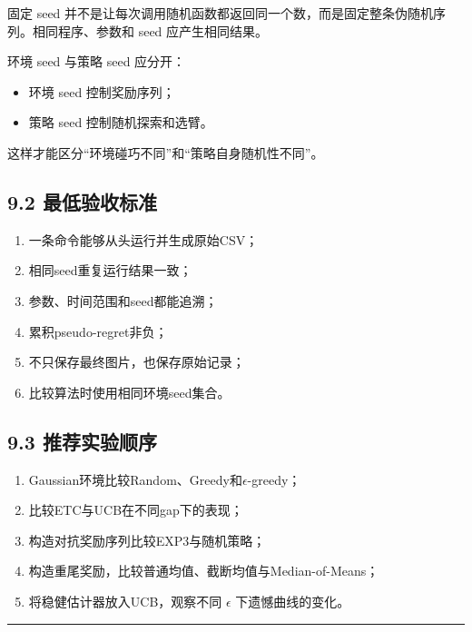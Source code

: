 \documentclass[
  11pt,
  a4paper,
]{ctexart}
\providecommand{\tightlist}{%
  \setlength{\itemsep}{0pt}\setlength{\parskip}{0pt}}
\begin{document}
固定 seed
并不是让每次调用随机函数都返回同一个数，而是固定整条伪随机序列。相同程序、参数和
seed 应产生相同结果。

环境 seed 与策略 seed 应分开：

\begin{itemize}
\tightlist
\item
  环境 seed 控制奖励序列；
\item
  策略 seed 控制随机探索和选臂。
\end{itemize}

这样才能区分``环境碰巧不同''和``策略自身随机性不同''。

\subsection{9.2
最低验收标准}\label{ux6700ux4f4eux9a8cux6536ux6807ux51c6}

\begin{enumerate}
\def\labelenumi{\arabic{enumi}.}
\tightlist
\item
  一条命令能够从头运行并生成原始CSV；
\item
  相同seed重复运行结果一致；
\item
  参数、时间范围和seed都能追溯；
\item
  累积pseudo-regret非负；
\item
  不只保存最终图片，也保存原始记录；
\item
  比较算法时使用相同环境seed集合。
\end{enumerate}

\subsection{9.3
推荐实验顺序}\label{ux63a8ux8350ux5b9eux9a8cux987aux5e8f}

\begin{enumerate}
\def\labelenumi{\arabic{enumi}.}
\tightlist
\item
  Gaussian环境比较Random、Greedy和\(\epsilon\)-greedy；
\item
  比较ETC与UCB在不同gap下的表现；
\item
  构造对抗奖励序列比较EXP3与随机策略；
\item
  构造重尾奖励，比较普通均值、截断均值与Median-of-Means；
\item
  将稳健估计器放入UCB，观察不同 \(\epsilon\) 下遗憾曲线的变化。
\end{enumerate}

\begin{center}\rule{0.5\linewidth}{0.5pt}\end{center}
\end{document}
